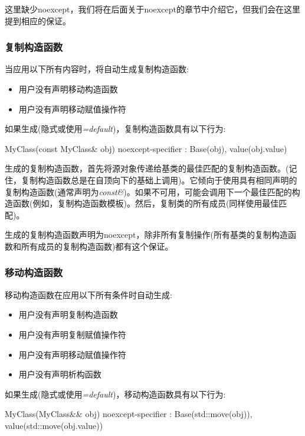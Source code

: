 这里缺少noexcept，我们将在后面关于noexcept的章节中介绍它，但我们会在这里提到相应的保证。

\subsubsection{复制构造函数}

当应用以下所有内容时，将自动生成复制构造函数:

\begin{itemize}
	\item 用户没有声明移动构造函数
	\item 用户没有声明移动赋值操作符
\end{itemize}

如果生成(隐式或使用\textit{=default})，复制构造函数具有以下行为:

\begin{cppcode}
MyClass(const MyClass& obj) noexcept-specifier
: Base(obj), value(obj.value) {
}
\end{cppcode}

生成的复制构造函数，首先将源对象传递给基类的最佳匹配的复制构造函数。(记住，复制构造函数总是在自顶向下的基础上调用)。它倾向于使用具有相同声明的复制构造函数(通常声明为\textit{const\&})。如果不可用，可能会调用下一个最佳匹配的构造函数(例如，复制构造函数模板)。然后，复制类的所有成员(同样使用最佳匹配)。

生成的复制构造函数声明为noexcept，除非所有复制操作(所有基类的复制构造函数和所有成员的复制构造函数)都有这个保证。

\subsubsection{移动构造函数}

移动构造函数在应用以下所有条件时自动生成:

\begin{itemize}
	\item 用户没有声明复制构造函数
	\item 用户没有声明复制赋值操作符
	\item 用户没有声明移动赋值操作符
	\item 用户没有声明析构函数
\end{itemize}

如果生成(隐式或使用\textit{=default})，移动构造函数具有以下行为:

\begin{cppcode}
MyClass(MyClass&& obj) noexcept-specifier
: Base(std::move(obj)), value(std::move(obj.value)) {
}
\end{cppcode}

